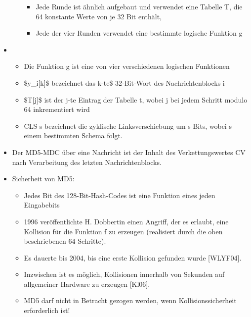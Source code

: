 \documentclass[a4paper]{article}
\begin{document}
\begin{multicols}{3}
\begin{itemize}
\begin{itemize}
                        \begin{itemize}
                            \item
                                  Jede Runde ist ähnlich aufgebaut und verwendet eine Tabelle T, die
                                  64 konstante Werte von je 32 Bit enthält,
                            \item
                                  Jede der vier Runden verwendet eine bestimmte logische Funktion g
                        \end{itemize}
              \end{itemize}
        \item

              \begin{itemize}
                  \item
                        Die Funktion g ist eine von vier verschiedenen logischen Funktionen
                  \item
                        \$y\_i{[}k{]}\$ bezeichnet das k-te\$ 32-Bit-Wort des
                        Nachrichtenblocks i
                  \item
                        \$T{[}j{]}\$ ist der j-te Eintrag der Tabelle t, wobei j bei jedem
                        Schritt modulo 64 inkrementiert wird
                  \item
                        CLS s bezeichnet die zyklische Linksverschiebung um s Bits, wobei s
                        einem bestimmten Schema folgt.
              \end{itemize}
        \item
              Der MD5-MDC über eine Nachricht ist der Inhalt des Verkettungswertes
              CV nach Verarbeitung des letzten Nachrichtenblocks.
        \item
              Sicherheit von MD5:

              \begin{itemize}
                  \item
                        Jedes Bit des 128-Bit-Hash-Codes ist eine Funktion eines jeden
                        Eingabebits
                  \item
                        1996 veröffentlichte H. Dobbertin einen Angriff, der es erlaubt,
                        eine Kollision für die Funktion f zu erzeugen (realisiert durch die
                        oben beschriebenen 64 Schritte).
                  \item
                        Es dauerte bis 2004, bis eine erste Kollision gefunden wurde
                        {[}WLYF04{]}.
                  \item
                        Inzwischen ist es möglich, Kollisionen innerhalb von Sekunden auf
                        allgemeiner Hardware zu erzeugen {[}Kl06{]}.
                  \item
                        MD5 darf nicht in Betracht gezogen werden, wenn Kollisionssicherheit
                        erforderlich ist!


\end{itemize}
\end{itemize}
\end{multicols}
\end{document}

